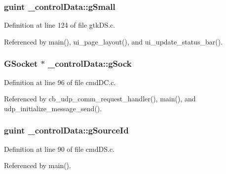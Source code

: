 \hypertarget{struct__control_data_aa53ce6d64a23cb93cc0c98e0835b6449}{}
\subsubsection[{g\+Small}]{\setlength{\rightskip}{0pt plus 5cm}guint \+\_\+control\+Data\+::g\+Small}\label{struct__control_data_aa53ce6d64a23cb93cc0c98e0835b6449}


Definition at line 124 of file gtk\+D\+S.\+c.



Referenced by main(), ui\+\_\+page\+\_\+layout(), and ui\+\_\+update\+\_\+status\+\_\+bar().

\hypertarget{struct__control_data_a49b267275036fc3ac9b7d9e53b0625e1}{}
\subsubsection[{g\+Sock}]{\setlength{\rightskip}{0pt plus 5cm}G\+Socket $\ast$ \+\_\+control\+Data\+::g\+Sock}\label{struct__control_data_a49b267275036fc3ac9b7d9e53b0625e1}


Definition at line 96 of file cmd\+D\+C.\+c.



Referenced by cb\+\_\+udp\+\_\+comm\+\_\+request\+\_\+handler(), main(), and udp\+\_\+initialize\+\_\+message\+\_\+send().

\hypertarget{struct__control_data_a719187f5c3c94da5aa08616db7820b98}{}
\subsubsection[{g\+Source\+Id}]{\setlength{\rightskip}{0pt plus 5cm}guint \+\_\+control\+Data\+::g\+Source\+Id}\label{struct__control_data_a719187f5c3c94da5aa08616db7820b98}


Definition at line 90 of file cmd\+D\+S.\+c.



Referenced by main().

\hypertarget{struct__control_data_a05dec2c5c598d299306a41430093b6de}{}
